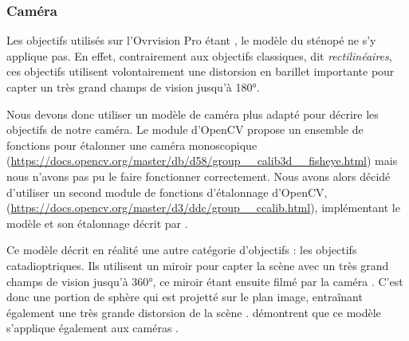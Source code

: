 \subsubsection{Caméra }
Les objectifs utilisés sur l'Ovrvision Pro étant , le modèle du sténopé ne s'y applique pas. En effet, contrairement aux objectifs classiques, dit \emph{rectilinéaires}, ces objectifs utilisent volontairement une distorsion en barillet importante pour capter un très grand champs de vision jusqu'à \ang{180}.

Nous devons donc utiliser un modèle de caméra plus adapté pour décrire les objectifs de notre caméra. Le module  d'OpenCV propose un ensemble de fonctions pour étalonner une caméra monoscopique  (\url{https://docs.opencv.org/master/db/d58/group__calib3d__fisheye.html}) mais nous n'avons pas pu le faire fonctionner correctement. Nous avons alors décidé d'utiliser un second module de fonctions d'étalonnage d'OpenCV,  (\url{https://docs.opencv.org/master/d3/ddc/group__ccalib.html}), implémentant le modèle et son étalonnage décrit par \cite{Mei2007}.

Ce modèle décrit en réalité une autre catégorie d'objectifs : les objectifs catadioptriques. Ils utilisent un miroir pour capter la scène avec un très grand champs de vision jusqu'à \ang{360}, ce miroir étant ensuite filmé par la caméra . C'est donc une portion de sphère qui est projetté sur le plan image, entraînant également une très grande distorsion de la scène . \citeauthor{Mei2007} démontrent que ce modèle s'applique également aux caméras .




